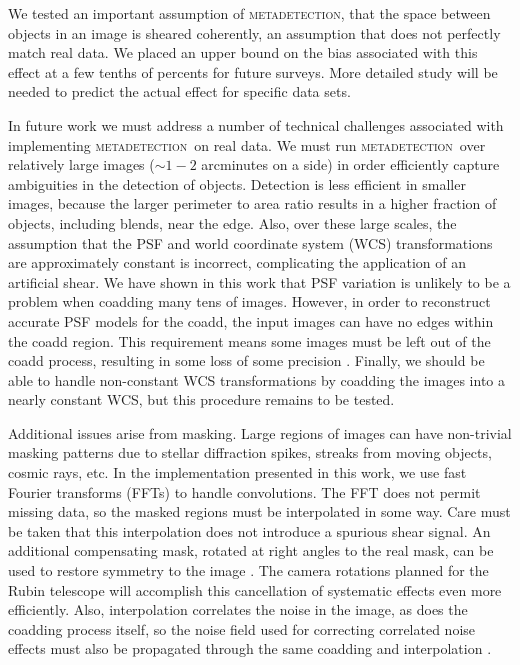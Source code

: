\documentclass[iop, twocolappendix, appendixfloats, numberedappendix, apj]{hackemulateapj}
\newcommand{\mdet}{\textsc{metadetection}}
\begin{document}
We tested an important assumption of \mdet, that the space between objects in
an image is sheared coherently, an assumption that does not perfectly match
real data.  We placed an upper bound on the bias associated with this effect at
a few tenths of percents for future surveys. More detailed study will be needed
to predict the actual effect for specific data sets.

In future work we must address a number of technical challenges associated with
implementing \mdet\ on real data.  We must run \mdet\ over relatively large
images ($\sim1-2$ arcminutes on a side) in order efficiently capture
ambiguities in the detection of objects.  Detection is less efficient in
smaller images, because the larger perimeter to area ratio results in a higher
fraction of objects, including blends, near the edge.  Also, over these large
scales, the assumption that the PSF and world coordinate system (WCS)
transformations are approximately constant is incorrect, complicating the
application of an artificial shear. We have shown in this work that PSF
variation is unlikely to be a problem when coadding many tens of images.
However, in order to reconstruct accurate PSF models for the coadd, the input
images can have no edges within the coadd region. This requirement means some
images must be left out of the coadd process, resulting in some loss of some
precision \citep{ArmstrongCoadd}. Finally, we should be able to handle
non-constant WCS transformations by coadding the images into a nearly constant
WCS, but this procedure remains to be tested.

Additional issues arise from masking. Large regions of images can have
non-trivial masking patterns due to stellar diffraction spikes, streaks from
moving objects, cosmic rays, etc. In the implementation presented in this work,
we use fast Fourier transforms (FFTs) to handle convolutions. The FFT does not
permit missing data, so the masked regions must be interpolated in some way.
Care must be taken that this interpolation does not introduce a spurious shear
signal.  An additional compensating mask, rotated at right angles to the real
mask, can be used to restore symmetry to the image \citep{SheldonMcal2017}. The
camera rotations planned for the Rubin telescope will accomplish this
cancellation of systematic effects even more efficiently.  Also, interpolation
correlates the noise in the image, as does the coadding process itself, so the
noise field used for correcting correlated noise effects must also be
propagated through the same coadding and interpolation
\citep{SheldonMcal2017,ArmstrongCoadd}.
\end{document}
